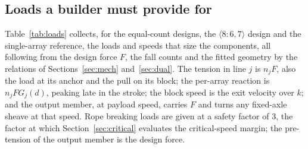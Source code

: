 \documentclass[preprint,12pt,number]{elsarticle}
\newcommand{\cfg}[2]{\langle #1,#2\rangle}
\begin{document}
\subsection{Loads a builder must provide for}
\label{sec:loads}

Table~\ref{tab:loads} collects, for the equal-count designs, the $\cfg{8{:}6}{7}$ design and the single-array reference, the loads and speeds that size the components, all following from the design force $F$, the fall counts and the fitted geometry by the relations of Sections~\ref{sec:mech} and~\ref{sec:dual}. The tension in line $j$ is $n_j F$, also the load at its anchor and the pull on its block; the per-array reaction is $n_j F G_j(d)$, peaking late in the stroke; the block speed is the exit velocity over $k$; and the output member, at payload speed, carries $F$ and turns any fixed-axle sheave at that speed. Rope breaking loads are given at a safety factor of 3, the factor at which Section~\ref{sec:critical} evaluates the critical-speed margin; the pre-tension of the output member is the design force.
\end{document}
